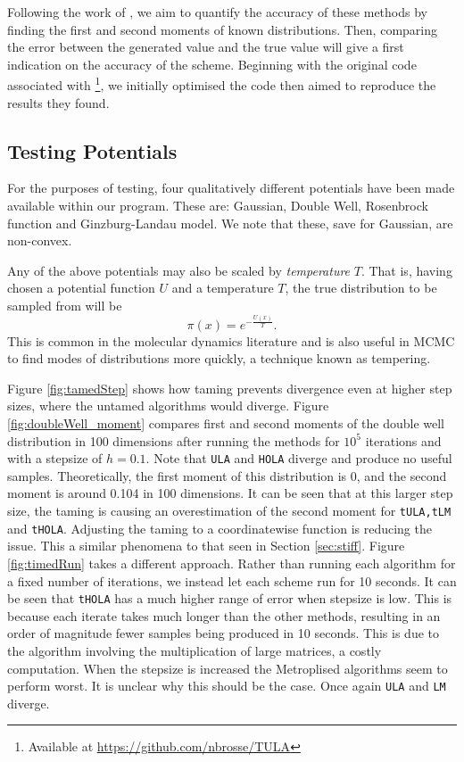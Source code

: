 Following the work of \cite{Brosse18tULA}, we aim to quantify the accuracy of these methods by finding the first and second moments of known distributions. Then, comparing the error between the generated value and the true value will give a first indication on the accuracy of the scheme. Beginning with the original code associated with \cite{Brosse18tULA}\footnote{Available at \url{https://github.com/nbrosse/TULA}}, we initially optimised the code then aimed to reproduce the results they found. 

\subsection{Testing Potentials}
For the purposes of testing, four qualitatively different potentials have been made available within our program. These are: Gaussian, Double Well, Rosenbrock function and Ginzburg-Landau model. We note that these, save for Gaussian, are non-convex.

Any of the above potentials may also be scaled by \textit{temperature} $T$. That is, having chosen a potential function $U$ and a temperature $T$, the true distribution to be sampled from will be
\[\pi(x) = e^{-\frac{U(x)}{T}}.\]
This is common in the molecular dynamics literature and is also useful in MCMC to find modes of distributions more quickly, a technique known as tempering.

Figure \ref{fig:tamedStep} shows how taming prevents divergence even at higher step sizes, where the untamed algorithms would diverge. Figure \ref{fig:doubleWell_moment} compares first and second moments of the double well distribution in 100 dimensions after running the methods for \(10^5\) iterations and with a stepsize of \(h=0.1\). Note that \texttt{ULA} and \texttt{HOLA} diverge and produce no useful samples. Theoretically, the first moment of this distribution is 0, and the second moment is around 0.104 in 100 dimensions. It can be seen that at this larger step size, the taming is causing an overestimation of the second moment for \texttt{tULA,tLM} and \texttt{tHOLA}. Adjusting the taming to a coordinatewise function is reducing the issue. This a similar phenomena to that seen in Section \ref{sec:stiff}. Figure \ref{fig:timedRun} takes a different approach. Rather than running each algorithm for a fixed number of iterations, we instead let each scheme run for 10 seconds. It can be seen that \texttt{tHOLA} has a much higher range of error when stepsize is low. This is because each iterate takes much longer than the other methods, resulting in an order of magnitude fewer samples being produced in 10 seconds. This is due to the algorithm involving the multiplication of large matrices, a costly computation. When the stepsize is increased the Metroplised algorithms seem to perform worst. It is unclear why this should be the case. Once again \texttt{ULA} and \texttt{LM} diverge.

